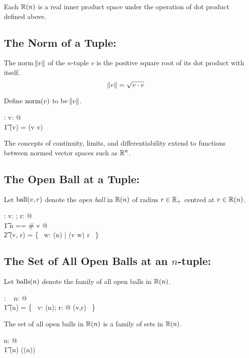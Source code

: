\documentclass[11pt, oneside]{article}
\begin{document}
Each $\operatorname{\mathbb{R}}(n)$ is a real inner product space under the operation of dot product defined above.

\subsection{The Norm of a Tuple: }

The norm $\norm{v}$ of the $n$-tuple $v$ is the positive square root of its dot product with itself.
$$
	\norm{v} = \sqrt{v \mathbin{\cdot} v}
$$

Define $\operatorname{norm}(v)$ to be $\norm{v}$.
\begin{axdef}
	\normRinf: \Rinf \fun \R
\where
	\forall v: \Rinf @ \\
	\t1	\normRinf(v) = \sqrtR(v \dotRinf v)
\end{axdef}

The concepts of continuity, limits, and differentiability extend to functions between normed vector spaces such as $\mathbb{R}^n$.

\subsection{The Open Ball at a Tuple: }

Let $\operatorname{ball}(v,r)$ denote the \textit{open ball} in $\operatorname{\mathbb{R}}(n)$ of radius $r  \in \mathbb{R}_{+}$ centred at $v \in \operatorname{\mathbb{R}}(n)$.

\begin{axdef}
\ballRinf: \Rinf \cross \Rpos \fun \power \Rinf
\where
\forall v: \Rinf; r: \Rpos @ \\
\t1	\LET n == \# v @ \\
\t2		\ballRinf(v, r) = \{~ w: \Rtup(n) | \normRinf(v \subRinf w) \ltR r ~\}
\end{axdef}

\subsection{The Set of All Open Balls at an $n$-tuple: }

Let $\operatorname{balls}(n)$ denote the family of all open balls in $\operatorname{\mathbb{R}}(n)$.

\begin{axdef}
	\ballsRtup: \nat \fun \family~\Rinf
\where
	\forall n: \nat @ \\
	\t1	\ballsRtup(n) =  \{~ v: \Rtup(n); r: \Rpos @ \ballRinf(v,r) ~\}
\end{axdef}

\begin{remark}
The set of all open balls in $\operatorname{\mathbb{R}}(n)$ is a family of sets in $\operatorname{\mathbb{R}}(n)$.

\begin{zed}
\forall n: \nat @ \\
\t1	\ballsRtup(n) \in \family(\Rtup(n))
\end{zed}

\end{remark}
\end{document}

